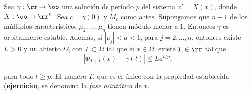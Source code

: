 \begin{teorema}
 Sea $\gamma:\rr\to\oo$ una solución de período $p$ del sistema $x'=X(x)$, donde $X:\oo\to \rr^n$. Sea $c=\gamma(0)$ y $M_c$ como antes. Supongamos que $n-1$ de los múltiplos 
 característicos $\mu_2,\ldots,\mu_n$ tienen módulo menor a $1$. Entonces $\gamma$ es orbitalmente estable. Además, si $|\mu_j|<a<1$, para $j=2,\ldots,n$, entonces 
 existe $L>0$ y un abierto $\Omega$, con $\Gamma\subset\Omega$ tal que si $x\in\Omega$, existe $T\in\rr$ tal que
 \begin{equation}\label{est_asi}
  |\Phi_{T+t}(x)-\gamma(t)|\leq La^{t/p},
 \end{equation}

 para todo $t\geq p$. El número $T$, que es  el único con la propiedad establecida (\textbf{ejercicio}), se denomina la \emph{fase asintótica} de $x$.
 
\end{teorema}



